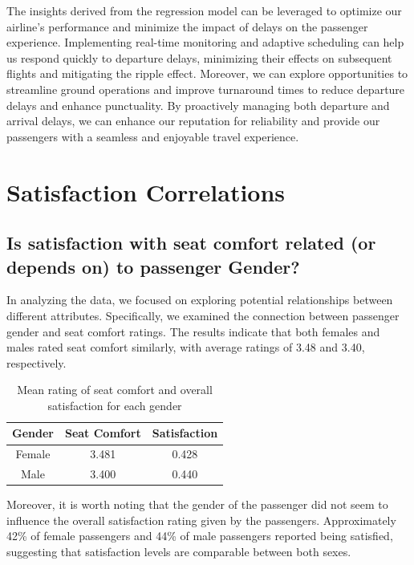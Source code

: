 \documentclass[11pt]{article}
\begin{document}
The insights derived from the regression model can be leveraged to optimize our airline's performance and minimize the impact of delays on the passenger experience. Implementing real-time monitoring and adaptive scheduling can help us respond quickly to departure delays, minimizing their effects on subsequent flights and mitigating the ripple effect. Moreover, we can explore opportunities to streamline ground operations and improve turnaround times to reduce departure delays and enhance punctuality. By proactively managing both departure and arrival delays, we can enhance our reputation for reliability and provide our passengers with a seamless and enjoyable travel experience.

    
    \hypertarget{question-7}{%
\section{Satisfaction Correlations}\label{question-7}}

    \hypertarget{question-7.1}{%
\subsection{Is satisfaction with seat comfort related (or depends on) to passenger Gender?}\label{question-7.1}}

In analyzing the data, we focused on exploring potential relationships between different attributes. Specifically, we examined the connection between passenger gender and seat comfort ratings. The results indicate that both females and males rated seat comfort similarly, with average ratings of 3.48 and 3.40, respectively.

\begin{table}[!h]
    \centering
    \begin{tabular}{|c|c|c|}
        \hline
        Gender & Seat Comfort & Satisfaction \\
        \hline
        Female  &    3.481   &     0.428 \\
        \hline
        Male  &    3.400   &     0.440 \\
        \hline
    \end{tabular}
    \caption{\centering Mean rating of seat comfort and overall satisfaction for each gender}
    \label{tab:7-1}
\end{table}

Moreover, it is worth noting that the gender of the passenger did not seem to influence the overall satisfaction rating given by the passengers. Approximately 42\% of female passengers and 44\% of male passengers reported being satisfied, suggesting that satisfaction levels are comparable between both sexes.
\end{document}
